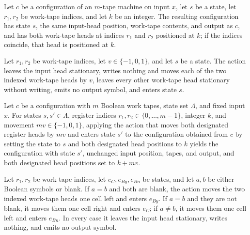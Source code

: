 \begin{definition}
\label{Complexity.LogProg.eqCfg}
\leanok
{}
Let $c$ be a configuration of an $m$-tape machine on input $x$, let $s$ be a state, let
$r_1,r_2$ be work-tape indices, and let $k$ be an integer. The resulting configuration
has state $s$, the same input-head position, work-tape contents, and output as $c$, and
has both work-tape heads at indices $r_1$ and $r_2$ positioned at $k$; if the indices
coincide, that head is positioned at $k$.
\end{definition}

\begin{definition}
\label{Complexity.LogProg.mv2Act}
\leanok
{}
Let $r_1,r_2$ be work-tape indices, let $v\in\{-1,0,1\}$, and let $s$ be a state. The
action leaves the input head stationary, writes nothing and moves each of the two
indexed work-tape heads by $v$, leaves every other work-tape head stationary without
writing, emits no output symbol, and enters state $s$.
\end{definition}

\begin{lemma}
\label{Complexity.LogProg.apply_mv2Act}
\leanok
{}
Let $c$ be a configuration with $m$ Boolean work tapes, state set $\Lambda$, and fixed
input $x$. For states $s,s'\in\Lambda$, register indices $r_1,r_2\in\{0,\ldots,m-1\}$,
integer $k$, and movement $mv\in\{-1,0,1\}$, applying the action that moves both
designated register heads by $mv$ and enters state $s'$ to the configuration obtained
from $c$ by setting the state to $s$ and both designated head positions to $k$ yields
the configuration with state $s'$, unchanged input position, tapes, and output, and both
designated head positions set to $k+mv$.
\end{lemma}

\begin{definition}
\label{Complexity.LogProg.eqCAct}
\leanok
{}
Let $r_1,r_2$ be work-tape indices, let $e_C,e_{By},e_{Bn}$ be states, and let $a,b$ be
either Boolean symbols or blank. If $a=b$ and both are blank, the action moves the two
indexed work-tape heads one cell left and enters $e_{By}$. If $a=b$ and they are not
blank, it moves them one cell right and enters $e_C$; if $a\ne b$, it moves them one
cell left and enters $e_{Bn}$. In every case it leaves the input head stationary, writes
nothing, and emits no output symbol.
\end{definition}

